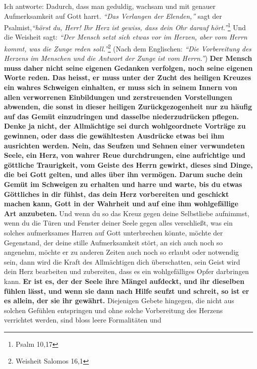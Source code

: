  Ich antworte: Dadurch, dass man geduldig,
wachsam und mit genauer Aufmerksamkeit
auf Gott harrt.
\textit{"`Das Verlangen der Elenden,"'} sagt der Psalmist,\textit{"`hörst du,
Herr! Ihr Herz ist gewiss, dass dein Ohr darauf hört."'}\footnote{Psalm 10,17}
Und die Weisheit sagt:
\textit{"`Der Mensch setzt sich etwas vor im Herzen, aber vom
Herrn kommt, was die Zunge reden soll."'}\footnote{Weisheit Salomos 16,1}
(Nach dem
Englischen:
\textit{"`Die Vorbereitung des Herzens im Menschen und die Antwort der Zunge
ist vom Herrn."'}) 
\label{ref:06_04_gebetshaltung} \textbf{Der Mensch muss
daher nicht seine eigenen Gedanken verfolgen,
noch seine eigenen Worte reden. Das heisst, er muss unter der Zucht des heiligen
Kreuzes ein wahres Schweigen einhalten, er muss sich in seinem Innern von allen
verworrenen Einbildungen und zerstreuenden Vorstellungen abwenden, die
sonst in dieser heiligen Zurückgezogenheit nur zu häufig auf das Gemüt
einzudringen und dasselbe niederzudrücken pflegen. Denke ja nicht, der
Allmächtige sei durch wohlgeordnete Vorträge zu gewinnen, oder dass die
gewähltesten Ausdrücke etwas bei ihm ausrichten werden. Nein, das Seufzen und
Sehnen einer verwundeten Seele, ein Herz, von wahrer Reue durchdrungen, eine
aufrichtige und göttliche Traurigkeit, vom Geiste des Herrn gewirkt, dieses sind
Dinge, die bei Gott gelten, und alles über ihn vermögen. Darum suche dein Gemüt
im Schweigen zu erhalten und harre und warte, bis du etwas Göttliches in dir
fühlst, das dein Herz vorbereiten und geschickt machen kann, Gott in der
Wahrheit und auf eine ihm wohlgefällige Art anzubeten.} 
Und wenn du so das Kreuz
gegen deine Selbstliebe aufnimmst, wenn du die Türen und Fenster deiner Seele
gegen alles verschließt, was ein solches aufmerksames Harren auf Gott
unterbrechen könnte, möchte der Gegenstand, der deine stille Aufmerksamkeit
stört, an sich auch noch so angenehm, möchte er zu anderen Zeiten auch noch so
erlaubt oder notwendig sein, dann wird die Kraft des Allmächtigen dich
überschatten, sein Geist wird dein Herz bearbeiten und zubereiten, dass es ein
wohlgefälliges Opfer darbringen kann. \textbf{Er ist es, der der Seele ihre
Mängel
aufdeckt, und ihr dieselben fühlen lässt, und wenn sie dann nach Hilfe seufzt
und schreit, so ist er es allein, der sie ihr gewährt.} 
Diejenigen Gebete
hingegen, die nicht aus solchen Gefühlen entspringen und ohne solche
Vorbereitung des Herzens verrichtet werden, sind bloss leere Formalitäten und
